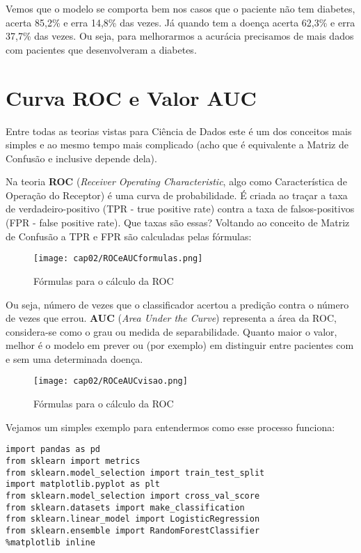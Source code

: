 Vemos que o modelo se comporta bem nos casos que o paciente não tem diabetes, acerta 85,2\% e erra 14,8\% das vezes. Já quando tem a doença acerta 62,3\% e erra 37,7\% das vezes. Ou seja, para melhorarmos a acurácia precisamos de mais dados com pacientes que desenvolveram a diabetes.

\section{Curva ROC e Valor AUC}
Entre todas as teorias vistas para Ciência de Dados este é um dos conceitos mais simples e ao mesmo tempo mais complicado (acho que é equivalente a Matriz de Confusão e inclusive depende dela).

Na teoria \textbf{ROC} (\textit{Receiver Operating Characteristic}, algo como Característica de Operação do Receptor) é uma curva de probabilidade. É criada ao traçar a taxa de verdadeiro-positivo (TPR - true positive rate) contra a taxa de falsos-positivos (FPR - false positive rate). Que taxas são essas? Voltando ao conceito de Matriz de Confusão a TPR e FPR são calculadas pelas fórmulas:
\begin{figure}[H]
	\centering
	\texttt{[image: cap02/ROCeAUCformulas.png]}
	\caption{Fórmulas para o cálculo da ROC}
\end{figure}

Ou seja, número de vezes que o classificador acertou a predição contra o número de vezes que errou. \textbf{AUC} (\textit{Area Under the Curve}) representa a área da ROC, considera-se como o grau ou medida de separabilidade. Quanto maior o valor, melhor é o modelo em prever ou (por exemplo) em distinguir entre pacientes com e sem uma determinada doença.
\begin{figure}[H]
	\centering
	\texttt{[image: cap02/ROCeAUCvisao.png]}
	\caption{Fórmulas para o cálculo da ROC}
\end{figure}

Vejamos um simples exemplo para entendermos como esse processo funciona:
\begin{lstlisting}
import pandas as pd
from sklearn import metrics
from sklearn.model_selection import train_test_split
import matplotlib.pyplot as plt
from sklearn.model_selection import cross_val_score
from sklearn.datasets import make_classification
from sklearn.linear_model import LogisticRegression
from sklearn.ensemble import RandomForestClassifier
%matplotlib inline
\end{lstlisting}

